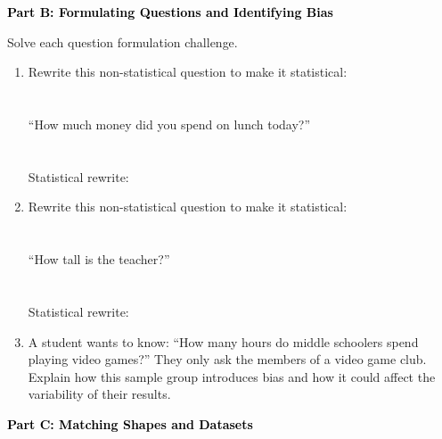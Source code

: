 \documentclass[12pt, letterpaper, fleqn]{article}
\newcommand{\blanklong}{\underline{\hspace{6.5cm}}}
\begin{document}
\newpage

\begin{tcolorbox}[colback=black!10]
    \large\textcolor{black}{\textbf{Part B: Formulating Questions and Identifying Bias}}
\end{tcolorbox}

\vspace{3mm}

\noindent
Solve each question formulation challenge.

\vspace{5mm}

\begin{enumerate}[itemsep=2.5cm, leftmargin=0.6cm]
\item Rewrite this non-statistical question to make it statistical: \\ \\ \\
``How much money did you spend on lunch today?'' \\ \\ \\
Statistical rewrite: \blanklong

\item Rewrite this non-statistical question to make it statistical: \\ \\ \\
``How tall is the teacher?'' \\ \\ \\
Statistical rewrite: \blanklong

\item A student wants to know: ``How many hours do middle schoolers spend playing video games?'' They only ask the members of a video game club. Explain how this sample group introduces bias and how it could affect the variability of their results.
\end{enumerate}

\newpage

\begin{tcolorbox}[colback=black!10]
    \large\textcolor{black}{\textbf{Part C: Matching Shapes and Datasets}}
\end{tcolorbox}
\end{document}
